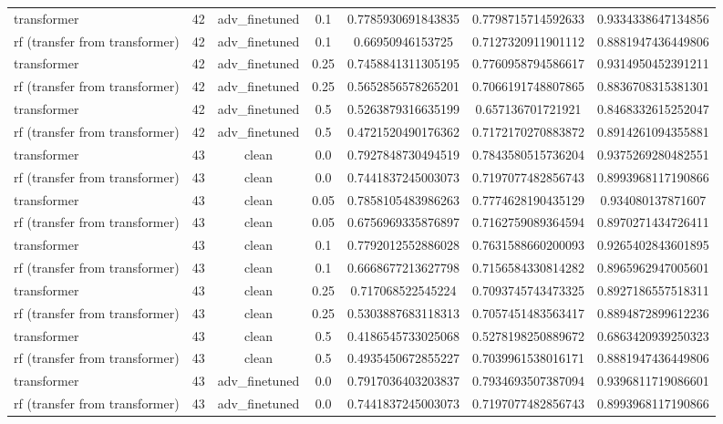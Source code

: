\begin{table}[htbp]
\begin{tabular}{lcccccc}
transformer & 42 & adv\_finetuned & 0.1 & 0.7785930691843835 & 0.7798715714592633 & 0.9334338647134856 \\
rf (transfer from transformer) & 42 & adv\_finetuned & 0.1 & 0.66950946153725 & 0.7127320911901112 & 0.8881947436449806 \\
transformer & 42 & adv\_finetuned & 0.25 & 0.7458841311305195 & 0.7760958794586617 & 0.9314950452391211 \\
rf (transfer from transformer) & 42 & adv\_finetuned & 0.25 & 0.5652856578265201 & 0.7066191748807865 & 0.8836708315381301 \\
transformer & 42 & adv\_finetuned & 0.5 & 0.5263879316635199 & 0.657136701721921 & 0.8468332615252047 \\
rf (transfer from transformer) & 42 & adv\_finetuned & 0.5 & 0.4721520490176362 & 0.7172170270883872 & 0.8914261094355881 \\
transformer & 43 & clean & 0.0 & 0.7927848730494519 & 0.7843580515736204 & 0.9375269280482551 \\
rf (transfer from transformer) & 43 & clean & 0.0 & 0.7441837245003073 & 0.7197077482856743 & 0.8993968117190866 \\
transformer & 43 & clean & 0.05 & 0.7858105483986263 & 0.7774628190435129 & 0.934080137871607 \\
rf (transfer from transformer) & 43 & clean & 0.05 & 0.6756969335876897 & 0.7162759089364594 & 0.8970271434726411 \\
transformer & 43 & clean & 0.1 & 0.7792012552886028 & 0.7631588660200093 & 0.9265402843601895 \\
rf (transfer from transformer) & 43 & clean & 0.1 & 0.6668677213627798 & 0.7156584330814282 & 0.8965962947005601 \\
transformer & 43 & clean & 0.25 & 0.717068522545224 & 0.7093745743473325 & 0.8927186557518311 \\
rf (transfer from transformer) & 43 & clean & 0.25 & 0.5303887683118313 & 0.7057451483563417 & 0.8894872899612236 \\
transformer & 43 & clean & 0.5 & 0.4186545733025068 & 0.5278198250889672 & 0.6863420939250323 \\
rf (transfer from transformer) & 43 & clean & 0.5 & 0.4935450672855227 & 0.7039961538016171 & 0.8881947436449806 \\
transformer & 43 & adv\_finetuned & 0.0 & 0.7917036403203837 & 0.7934693507387094 & 0.9396811719086601 \\
rf (transfer from transformer) & 43 & adv\_finetuned & 0.0 & 0.7441837245003073 & 0.7197077482856743 & 0.8993968117190866 \\

\end{tabular}
\end{table}
